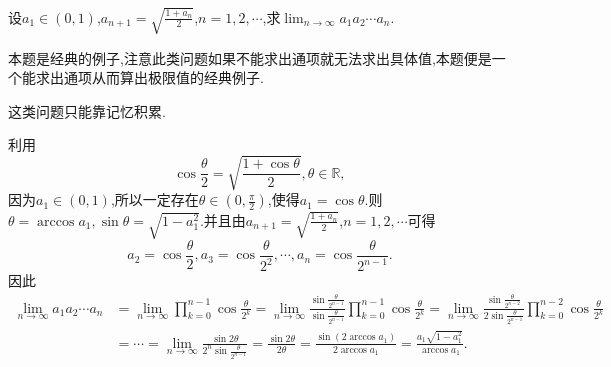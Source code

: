 \documentclass[lang=cn,newtx,10pt,scheme=chinese]{elegantbook}
\begin{document}
\begin{example}
设\(a_1\in(0,1)\),\(a_{n + 1}=\sqrt{\frac{1 + a_n}{2}}\),\(n = 1,2,\cdots\),求\(\lim_{n\rightarrow\infty}a_1a_2\cdots a_n\).
\end{example}
\begin{note}
   本题是经典的例子,注意此类问题如果不能求出通项就无法求出具体值,本题便是一个能求出通项从而算出极限值的经典例子.
\end{note}
\begin{remark}
   这类问题只能靠记忆积累.
\end{remark}
\begin{solution}
利用
\[
\cos\frac{\theta}{2}=\sqrt{\frac{1 + \cos\theta}{2}},\theta\in\mathbb{R},
\]
因为$a_1\in (0,1)$,所以一定存在$\theta\in(0,\frac{\pi}{2})$,使得\(a_1=\cos\theta\).则$\theta=\arccos a_1,\sin\theta=\sqrt{1-a_1^2}$.并且由\(a_{n + 1}=\sqrt{\frac{1 + a_n}{2}}\),\(n = 1,2,\cdots\)可得
\[
a_2=\cos\frac{\theta}{2},a_3=\cos\frac{\theta}{2^2},\cdots,a_n=\cos\frac{\theta}{2^{n - 1}}.
\]
因此
\begin{align*}
\lim_{n\rightarrow\infty}a_1a_2\cdots a_n&=\lim_{n\rightarrow\infty}\prod_{k = 0}^{n - 1}\cos\frac{\theta}{2^k}=\lim_{n\rightarrow\infty}\frac{\sin\frac{\theta}{2^{n - 1}}}{\sin\frac{\theta}{2^{n - 1}}}\prod_{k = 0}^{n - 1}\cos\frac{\theta}{2^k}=\lim_{n\rightarrow\infty}\frac{\sin\frac{\theta}{2^{n - 2}}}{2\sin\frac{\theta}{2^{n - 1}}}\prod_{k = 0}^{n - 2}\cos\frac{\theta}{2^k}\\
&=\cdots=\lim_{n\rightarrow\infty}\frac{\sin2\theta}{2^n\sin\frac{\theta}{2^{n - 1}}}=\frac{\sin2\theta}{2\theta}=\frac{\sin(2\arccos a_1)}{2\arccos a_1}=\frac{a_1\sqrt{1 - a_1^2}}{\arccos a_1}.
\end{align*}
\end{solution}
\end{document}
